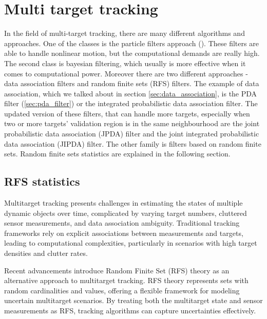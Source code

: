 \section{Multi target tracking}
In the field of multi-target tracking, there are many different algorithms and approaches. One of the classes is the particle filters approach (\cite{Particle_Khan2005, Particle_Gustafsson2002, Particle_Doucet2001,nonlinearParticleFilter}). These filters are able to handle nonlinear motion, but the computational demands are really high. The second class is bayesian filtering, which usually is more effective when it comes to computational power. Moreover there are two different approaches - data association filters and random finite sets (RFS) filters. The example of data association, which we talked about in section \ref{sec:data_association}, is the PDA filter (\ref{sec:pda_filter}) or the integrated probabilistic data association filter. The updated version of these filters, that can handle more targets, especially when two or more targets' validation region is in the same neighbourhood are the joint probabilistic data association (JPDA) filter and the joint integrated probabilistic data association (JIPDA) filter. The other family is filters based on random finite sets. Random finite sets statistics are explained in the following section.
    \subsection{RFS statistics}
Multitarget tracking presents challenges in estimating the states of multiple dynamic objects over time, complicated by varying target numbers, cluttered sensor measurements, and data association ambiguity. Traditional tracking frameworks rely on explicit associations between measurements and targets, leading to computational complexities, particularly in scenarios with high target densities and clutter rates.

Recent advancements introduce Random Finite Set (RFS) theory as an alternative approach to multitarget tracking. RFS theory represents sets with random cardinalities and values, offering a flexible framework for modeling uncertain multitarget scenarios. By treating both the multitarget state and sensor measurements as RFS, tracking algorithms can capture uncertainties effectively.

